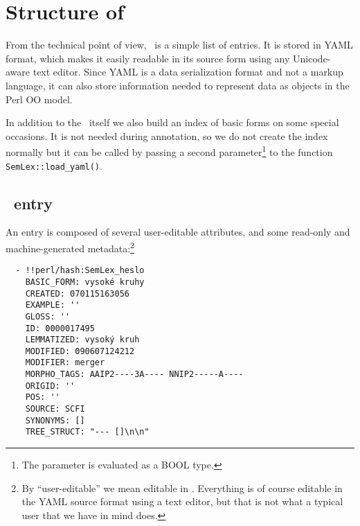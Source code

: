 \section{Structure of \semlex}

From the technical point of view, \semlex\ is a simple list of entries. It is stored in YAML format, which makes it easily readable in its source form using any Unicode-aware text editor. Since YAML is a data serialization format and not a markup language, it can also store information needed to represent data as objects in the Perl OO model. 

In addition to the \semlex\ itself we also build an index of basic forms on some special occasions. It is not needed during annotation, so we do not create the index normally but it can be called by passing a second parameter\footnote{The parameter is evaluated as a BOOL type.} to the function \verb=SemLex::load_yaml()=. 

\subsection{\semlex\ entry}
\label{sec:semlex:entry}
An entry is composed of several user-editable attributes, and some read-only and machine-generated metadata:\footnote{By ``user-editable'' we mean editable in \seman. Everything is of course editable in the YAML source format using a text editor, but that is not what a typical user that we have in mind does.} 
\begin{verbatim}
  - !!perl/hash:SemLex_heslo 
    BASIC_FORM: vysoké kruhy
    CREATED: 070115163056
    EXAMPLE: ''
    GLOSS: ''
    ID: 0000017495
    LEMMATIZED: vysoký kruh
    MODIFIED: 090607124212
    MODIFIER: merger
    MORPHO_TAGS: AAIP2----3A---- NNIP2-----A----
    ORIGID: ''
    POS: ''
    SOURCE: SCFI
    SYNONYMS: []
    TREE_STRUCT: "--- []\n\n"
\end{verbatim}

